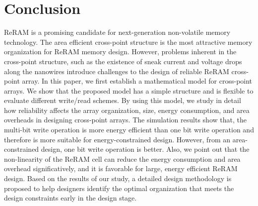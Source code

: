 \section{Conclusion}\label{sec:conclusion}

ReRAM is a promising candidate for next-generation non-volatile memory technology. The area efficient cross-point structure is the most attractive memory organization for ReRAM memory design. However, problems inherent in the cross-point structure, such as the existence of sneak current and voltage drops along the nanowires introduce challenges to the design of reliable ReRAM cross-point array. In this paper, we first establish a mathematical model for cross-point arrays. We show that the proposed model has a simple structure and is flexible to evaluate different write/read schemes. By using this model, we study in detail how reliability affects the array organization, size, energy consumption, and area overheads in designing cross-point arrays. The simulation results show that, the multi-bit write operation is more energy efficient than one bit write operation and therefore is more suitable for energy-constrained design. However, from an area-constrained design, one bit write operation is better. Also, we point out that the non-linearity of the ReRAM cell can reduce the energy consumption and area overhead significatively, and it is favorable for large, energy efficient ReRAM design. Based on the results of our study, a detailed design methodology is proposed to help designers identify the optimal organization that meets the design constraints early in the design stage.
